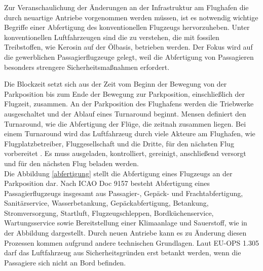 Zur Veranschaulichung der Änderungen an der Infrastruktur am Flughafen die durch neuartige Antriebe vorgenommen werden müssen, 
ist es notwendig wichtige Begriffe einer Abfertigung des konventionellen Flugzeugs hervorzuheben. 
Unter konventionellen Luftfahrzeugen sind die zu verstehen,
die mit fossilen Treibstoffen, wie Kerosin auf der Ölbasis, betrieben werden. Der Fokus wird auf die gewerblichen Passagierflugzeuge gelegt,
weil die Abfertigung von Passagieren besonders strengere Sicherheitsmaßnahmen erfordert. %

Die Blockzeit setzt sich aus der Zeit vom Beginn der Bewegung von der Parkposition bis zum Ende der Bewegung zur Parkposition, 
einschließlich der Flugzeit, zusammen.
An der Parkposition des Flughafens werden die Triebwerke ausgeschaltet und der Ablauf eines Turnaround beginnt. 
Mensen \cite{mensen2013handbuch} definiert den Turnaround, wie die Abfertigung der Flüge, die zeitnah zusammen liegen.
Bei einem Turnaround wird das Luftfahrzeug durch viele Akteure am Flughafen, wie Flugplatzbetreiber, Fluggesellschaft und die Dritte, für 
den nächsten Flug vorbereitet \cite{mensen2013handbuch}. Es muss ausgeladen, kontrolliert, gereinigt, anschließend versorgt 
und für den nächsten Flug beladen werden. \\

Die Abbildung \ref{abfertigung} stellt die Abfertigung eines Flugzeugs an der Parkposition dar.
Nach ICAO Doc 9157 besteht Abfertigung eines Passagierflugzeugs insgesamt aus Passagier-, Gepäck- und Frachtabfertigung, 
Sanitärservice, Wasserbetankung, Gepäckabfertigung, Betankung, Stromversorgung,
Startluft, Flugzeugschleppen, Bordküchenservice, Wartungsservice sowie Bereitstellung einer Klimaanlage und Sauerstoff,
wie in der Abbildung dargestellt. Durch neuen Antriebe kann es zu Änderung diesen Prozessen kommen aufgrund andere technischen Grundlagen.
Laut EU-OPS 1.305 darf das Luftfahrzeug aus Sicherheitsgründen erst betankt werden, wenn die Passagiere sich nicht an Bord befinden. 
%

